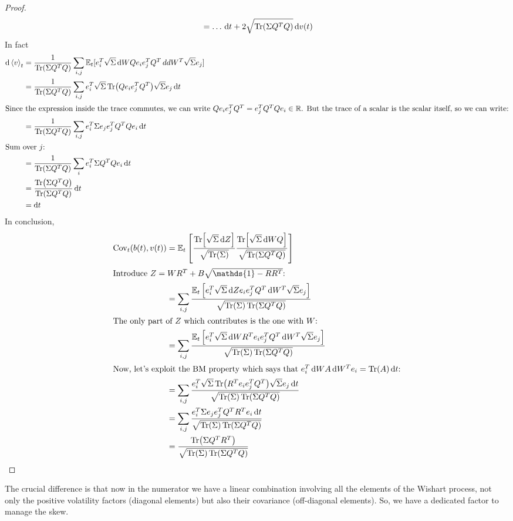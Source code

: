 \begin{proof}
\begin{align*}
        &=
        \dots\,\dd t + 2\sqrt{\Tr(\Sigma Q^TQ)}\,\dd v(t) \\
    \end{align*}
    In fact
    \begin{align*}
        \dd\expval{v}_t &= \frac{1}{\Tr(\Sigma Q^TQ)}\sum_{i,j}\mathbb{E}_t[e^T_i\sqrt{\Sigma}\,\dd WQ e_i e^T_j Q^T\,dd W^T \sqrt{\Sigma} e_j] \\
        &=
        \frac{1}{\Tr(\Sigma Q^TQ)}\sum_{i,j}e^T_i\sqrt{\Sigma}\Tr(Qe_ie_j^TQ^T)\sqrt{\Sigma}e_j\,\dd t \\
        \intertext{Since the expression inside the trace commutes, we can write $Qe_ie_j^TQ^T = e^T_jQ^TQe_i\in\mathbb{R}$. But the trace of a scalar is the scalar itself, so we can write:}
        &=
        \frac{1}{\Tr(\Sigma Q^TQ)}\sum_{i,j}e^T_i\Sigma e_j e_j^TQ^TQe_i\,\dd t \\
        \intertext{Sum over $j$:}
        &=
        \frac{1}{\Tr(\Sigma Q^TQ)} \sum_{i} e^T_i\Sigma Q^TQe_i\,\dd t \\
        &=
        \frac{\Tr(\Sigma Q^TQ)}{\Tr(\Sigma Q^TQ)}\,\dd t \\
        &=
        \dd t
    \end{align*}
    In conclusion,
    \begin{align*}
        \Cov_t(b(t),v(t)) &= \mathbb{E}_t\left[\frac{\Tr[\sqrt{\Sigma}\,\dd Z]}{\sqrt{\Tr(\Sigma)}} \frac{\Tr[\sqrt{\Sigma}\,\dd WQ]}{\sqrt{\Tr(\Sigma Q^TQ)}}\right] \\
        \intertext{Introduce $Z = WR^T + B\sqrt{\mathds{1}-RR^T}$:}
        &=
        \sum_{i,j}\frac{\mathbb{E}_t\left[e^T_i\sqrt{\Sigma}\,\dd Z e_i e^T_j Q^T\,\dd W^T\sqrt{\Sigma}e_j\right]}{\sqrt{\Tr(\Sigma)\Tr(\Sigma Q^TQ)}} \\
        \intertext{The only part of $Z$ which contributes is the one with $W$:}
        &=
        \sum_{i,j}\frac{\mathbb{E}_t\left[e^T_i\sqrt{\Sigma}\,\dd WR^T e_i e^T_j Q^T\,\dd W^T\sqrt{\Sigma}e_j\right]}{\sqrt{\Tr(\Sigma)\Tr(\Sigma Q^TQ)}} \\
        \intertext{Now, let's exploit the BM property which says that $e^T_i\,\dd WA\,\dd W^Te_i = \Tr(A)\,\dd t$:}
        &=
        \sum_{i,j}\frac{e^T_i\sqrt{\Sigma}\Tr(R^Te_ie_j^TQ^T)\sqrt{\Sigma}e_j\,\dd t}{\sqrt{\Tr(\Sigma)\Tr(\Sigma Q^TQ)}} \\
        &=
        \sum_{i,j}\frac{e^T_i\Sigma e_je_j^TQ^TR^Te_i\,\dd t}{\sqrt{\Tr(\Sigma)\Tr(\Sigma Q^TQ)}} \\
        &=
        \frac{\Tr(\Sigma Q^TR^T)}{\sqrt{\Tr(\Sigma)\Tr(\Sigma Q^TQ)}}
    \end{align*}
\end{proof}
The crucial difference is that now in the numerator we have a linear combination involving all the elements of the Wishart process, not only the positive volatility factors (diagonal elements) but also their covariance (off-diagonal elements). So, we have a dedicated factor to manage the skew.

